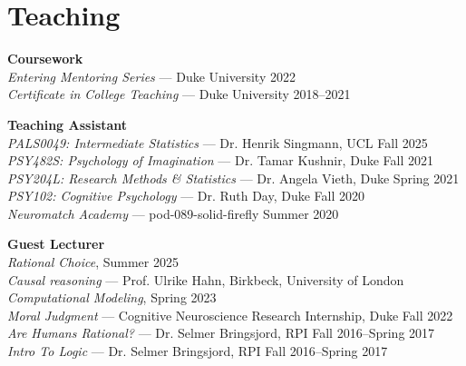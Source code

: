 \section{Teaching}
\textbf{Coursework} \\
\emph{Entering Mentoring Series} --- Duke University \hfill 2022 \\
\emph{Certificate in College Teaching} --- Duke University \hfill 2018--2021

\textbf{Teaching Assistant} \\
\emph{PALS0049: Intermediate Statistics} --- Dr. Henrik Singmann, UCL \hfill Fall 2025 \\
\emph{PSY482S: Psychology of Imagination} --- Dr. Tamar Kushnir, Duke \hfill Fall 2021 \\
\emph{PSY204L: Research Methods \& Statistics} --- Dr. Angela Vieth, Duke \hfill Spring 2021 \\
\emph{PSY102: Cognitive Psychology} --- Dr. Ruth Day, Duke  \hfill Fall 2020 \\
\emph{Neuromatch Academy} --- pod-089-solid-firefly \hfill Summer 2020

\textbf{Guest Lecturer} \\
\emph{Rational Choice}, \hfill Summer 2025 \\
\emph{Causal reasoning} ---  Prof. Ulrike Hahn, Birkbeck, University of London \\ 
\emph{Computational Modeling},  \hfill Spring 2023 \\
\emph{Moral Judgment} --- Cognitive Neuroscience Research Internship, Duke \hfill Fall 2022 \\
\emph{Are Humans Rational?} --- Dr. Selmer Bringsjord, RPI \hfill Fall 2016--Spring 2017 \\
\emph{Intro To Logic} --- Dr. Selmer Bringsjord, RPI \hfill Fall 2016--Spring 2017
